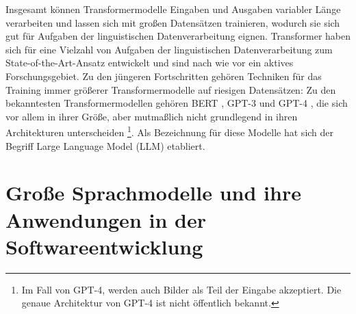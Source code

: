 Insgesamt können Transformermodelle Eingaben und Ausgaben variabler Länge verarbeiten und lassen sich mit großen Datensätzen trainieren, wodurch sie sich gut für Aufgaben der linguistischen Datenverarbeitung eignen.
Transformer haben sich für eine Vielzahl von Aufgaben der linguistischen Datenverarbeitung zum State-of-the-Art-Ansatz entwickelt und sind nach wie vor ein aktives Forschungsgebiet.
Zu den jüngeren Fortschritten gehören Techniken für das Training immer größerer Transformermodelle auf riesigen Datensätzen:
Zu den bekanntesten Transformermodellen gehören BERT \cite{bert}, GPT-3 \cite{FewShotLearners} und GPT-4 \cite{gpt4}, die sich vor allem in ihrer Größe, aber mutmaßlich nicht grundlegend in ihren Architekturen unterscheiden \footnote{Im Fall von GPT-4, werden auch Bilder als Teil der Eingabe akzeptiert. Die genaue Architektur von GPT-4 ist nicht öffentlich bekannt.}.
Als Bezeichnung für diese Modelle hat sich der Begriff Large Language Model (LLM) etabliert.

\section{Große Sprachmodelle und ihre Anwendungen in der Softwareentwicklung}
\label{subsec:Foundations:LLM}




